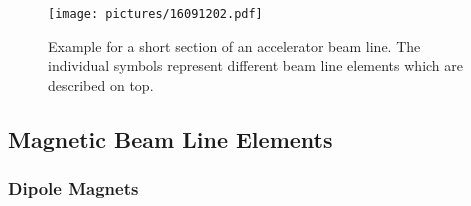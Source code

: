 \begin{figure}[htbp]  
    \centering
    \texttt{[image: pictures/16091202.pdf]}
    \caption{Example for a short section of an accelerator beam line. The individual symbols represent different beam line elements which are described on top.}  
    \label{pic:16060601}
\end{figure}

\subsection{Magnetic Beam Line Elements}

\subsubsection{Dipole Magnets} 


